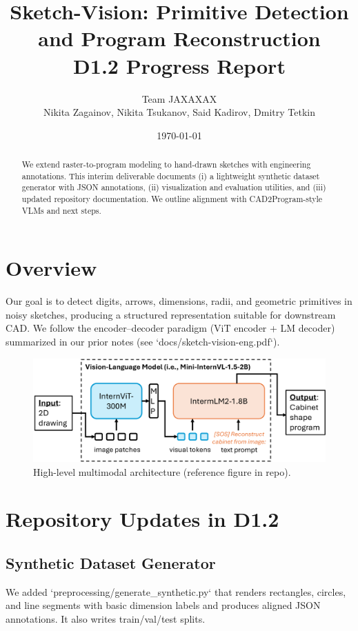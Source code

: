 \documentclass[11pt,a4paper]{article}
\title{Sketch-Vision: Primitive Detection and Program Reconstruction\\\large D1.2 Progress Report}
\author{Team JAXAXAX\\Nikita Zagainov, Nikita Tsukanov, Said Kadirov, Dmitry Tetkin}
\date{\today}
\begin{document}
\maketitle

\begin{abstract}
We extend raster-to-program modeling to hand-drawn sketches with engineering annotations. This interim deliverable documents (i) a lightweight synthetic dataset generator with JSON annotations, (ii) visualization and evaluation utilities, and (iii) updated repository documentation. We outline alignment with CAD2Program-style VLMs and next steps.
\end{abstract}

\section{Overview}
Our goal is to detect digits, arrows, dimensions, radii, and geometric primitives in noisy sketches, producing a structured representation suitable for downstream CAD. We follow the encoder--decoder paradigm (ViT encoder + LM decoder) summarized in our prior notes (see `docs/sketch-vision-eng.pdf`).

\begin{figure}[h]
  \centering
  \includegraphics[width=0.9\linewidth]{internvl.png}
  \caption{High-level multimodal architecture (reference figure in repo).}
\end{figure}

\section{Repository Updates in D1.2}
\subsection{Synthetic Dataset Generator}
We added `preprocessing/generate_synthetic.py` that renders rectangles, circles, and line segments with basic dimension labels and produces aligned JSON annotations. It also writes train/val/test splits.
\end{document}
